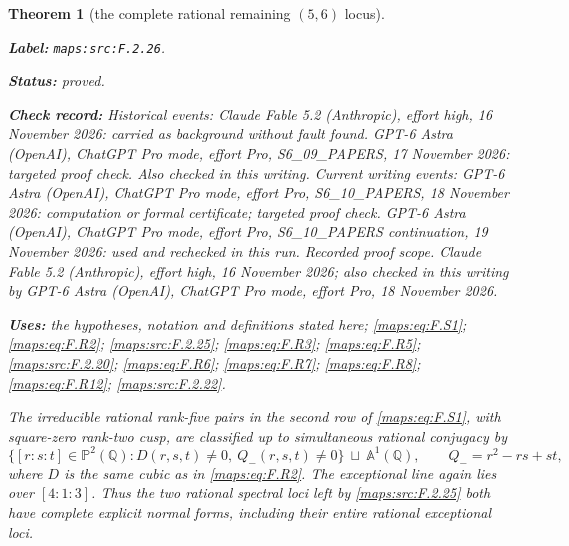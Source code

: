 \documentclass[11pt,a4paper]{article}
\newtheorem{theorem}{Theorem}[section]
\theoremstyle{definition}
\newcommand{\StatementRecord}[4]{\par\smallskip\begingroup\upshape\raggedright\noindent\textbf{Label:} \nolinkurl{#1}.\par\noindent\textbf{Status:} #2.\par\noindent\textbf{Check record:} #3.\par\noindent\textbf{Uses:} #4.\par\endgroup\smallskip}
\begin{document}
\begin{theorem}[the complete rational remaining $(5,6)$ locus]\label{maps:src:F.2.26}
\StatementRecord{maps:src:F.2.26}{proved}{Historical events: Claude Fable 5.2 (Anthropic), effort high, 16 November 2026: carried as background without fault found. GPT-6 Astra (OpenAI), ChatGPT Pro mode, effort Pro, S6\_09\_PAPERS, 17 November 2026: targeted proof check. Also checked in this writing. Current writing events: GPT-6 Astra (OpenAI), ChatGPT Pro mode, effort Pro, S6\_10\_PAPERS, 18 November 2026: computation or formal certificate; targeted proof check. GPT-6 Astra (OpenAI), ChatGPT Pro mode, effort Pro, S6\_10\_PAPERS continuation, 19 November 2026: used and rechecked in this run. \emph{Recorded proof scope.} Claude Fable 5.2 (Anthropic), effort high, 16 November 2026; also checked in this writing by GPT-6 Astra (OpenAI), ChatGPT Pro mode, effort Pro, 18 November 2026}{the hypotheses, notation and definitions stated here; \cref{maps:eq:F.S1}; \cref{maps:eq:F.R2}; \cref{maps:src:F.2.25}; \cref{maps:eq:F.R3}; \cref{maps:eq:F.R5}; \cref{maps:src:F.2.20}; \cref{maps:eq:F.R6}; \cref{maps:eq:F.R7}; \cref{maps:eq:F.R8}; \cref{maps:eq:F.R12}; \cref{maps:src:F.2.22}}


The irreducible rational rank-five pairs in the second row
of \eqref{maps:eq:F.S1}, with square-zero rank-two cusp, are classified
up to simultaneous rational conjugacy by
\[
 \{[r:s:t]\in\mathbb P^2(\mathbb Q):
             D(r,s,t)\ne0,\ Q_-(r,s,t)\ne0\}
       \ \sqcup\ \mathbb A^1(\mathbb Q),
 \qquad Q_-=r^2-rs+st,
 \tag{F.R10}\label{maps:eq:F.R10}
\]
where $D$ is the same cubic as in \eqref{maps:eq:F.R2}.
The exceptional line again lies over $[4:1:3]$.
Thus the two rational spectral loci left by \ref{maps:src:F.2.25} both
have complete explicit normal forms, including their
entire rational exceptional loci.

\end{theorem}
\end{document}
